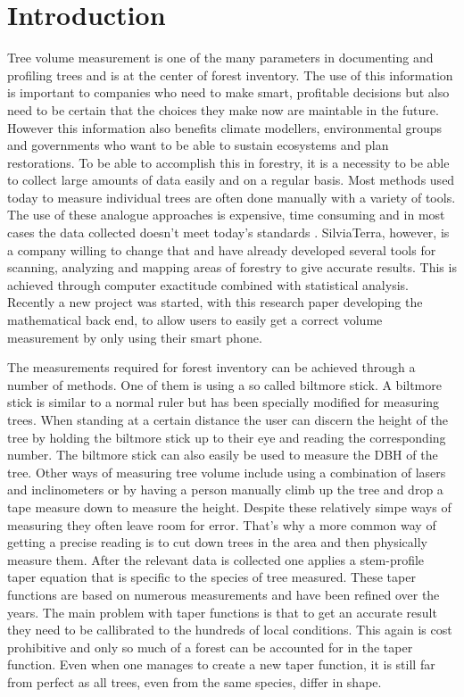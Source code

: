 

\newcommand{\degree}{$^\circ$}

\section{Introduction}
Tree volume measurement is one of the many parameters in documenting and 
profiling trees and is at the center of forest inventory. The use of this 
information is important to companies who need to make smart, profitable 
decisions but also need to be certain that the choices they make now are 
maintable in the future. However this information also benefits climate 
modellers, environmental groups and governments who want to be able to sustain 
ecosystems and plan restorations. To be able to accomplish this in forestry, 
it is a necessity to be able to collect large amounts of data easily and on a 
regular basis. Most methods used today to measure individual trees are often 
done manually with a variety of tools. The use of these analogue approaches 
is expensive, time consuming and in most cases the data collected doesn't meet 
today's standards \cite{digital imaged based tree measurement for forest inventory}. 
SilviaTerra, however, is a company willing to change that and have already 
developed several tools for scanning, analyzing and mapping areas of forestry 
to give accurate results. This is achieved through computer exactitude combined 
with statistical analysis. Recently a new project was started, with this 
research paper developing the mathematical back end, to allow users to easily 
get a correct volume measurement by only using their smart phone.

The measurements required for forest inventory can be achieved through a number 
of methods. One of them is using a so called biltmore stick. A biltmore stick 
is similar to a normal ruler but has been specially modified for measuring trees. 
When standing at a certain distance the user can discern the height of the tree 
by holding the biltmore stick up to their eye and reading the corresponding number. 
The biltmore stick can also easily be used to measure the DBH of the tree. 
Other ways of measuring tree volume include using a combination of lasers and 
inclinometers or by having a person manually climb up the tree and drop a tape 
measure down to measure the height. Despite these relatively simpe ways of 
measuring they often leave room for error. That’s why a more common way of 
getting a precise reading is to cut down trees in the area and then physically 
measure them. After the relevant data is collected one applies a stem-profile 
taper equation that is specific to the species of tree measured. These taper 
functions are based on numerous measurements and have been refined over the years. 
The main problem with taper functions is that to get an accurate result they 
need to be callibrated to the hundreds of local conditions. This again is cost 
prohibitive and only so much of a forest can be accounted for in the taper function. 
Even when one manages to create a new taper function, it is still far from 
perfect as all trees, even from the same species, differ in shape.

